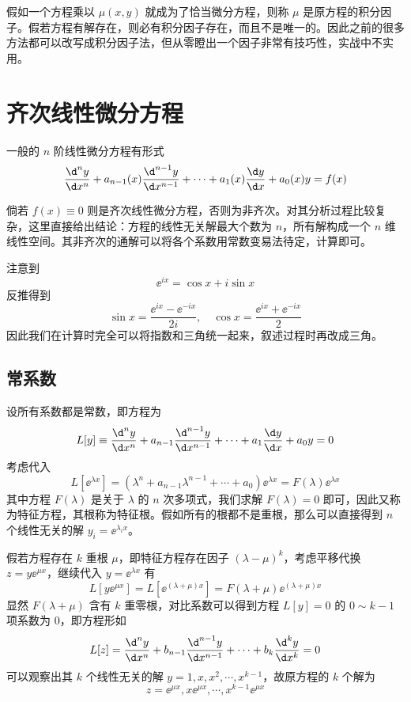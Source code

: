 假如一个方程乘以 $\mu(x, y)$ 就成为了恰当微分方程，则称 $\mu$ 是原方程的积分因子。假若方程有解存在，则必有积分因子存在，而且不是唯一的。因此之前的很多方法都可以改写成积分因子法，但从零瞪出一个因子非常有技巧性，实战中不实用。

\section{齐次线性微分方程}

一般的 $n$ 阶线性微分方程有形式
\[ \frac{\d^n y}{\d x^n} + a_{n-1}(x) \frac{\d^{n-1} y}{\d x^{n-1}} + \cdots + a_1(x) \frac{\d y}{\d x} + a_0(x) y = f(x) \]

倘若 $f(x) \equiv 0$ 则是齐次线性微分方程，否则为非齐次。对其分析过程比较复杂，这里直接给出结论：方程的线性无关解最大个数为 $n$，所有解构成一个 $n$ 维线性空间。其非齐次的通解可以将各个系数用常数变易法待定，计算即可。

注意到
\[ \ee^{i x} = \cos x + i \sin x \]
反推得到
\[ \sin x = \frac{\ee^{i x} - \ee^{-i x}}{2i}, \quad \cos x = \frac{\ee^{ix} + \ee^{-ix}}{2} \]
因此我们在计算时完全可以将指数和三角统一起来，叙述过程时再改成三角。

\subsection{常系数}

设所有系数都是常数，即方程为
\[ L[y] \equiv \frac{\d^n y}{\d x^n} + a_{n-1} \frac{\d^{n-1} y}{\d x^{n-1}} + \cdots + a_1 \frac{\d y}{\d x} + a_0 y = 0 \]
考虑代入
\[ L[\ee^{\lambda x}] = (\lambda^n + a_{n-1} \lambda^{n-1} + \cdots + a_0) \ee^{\lambda x} = F(\lambda) \ee^{\lambda x} \]
其中方程 $F(\lambda)$ 是关于 $\lambda$ 的 $n$ 次多项式，我们求解 $F(\lambda) = 0$ 即可，因此又称为特征方程，其根称为特征根。假如所有的根都不是重根，那么可以直接得到 $n$ 个线性无关的解 $y_i = \ee^{\lambda_i x}$。

假若方程存在 $k$ 重根 $\mu$，即特征方程存在因子 $(\lambda - \mu)^k$，考虑平移代换 $z = y \ee^{\mu x}$，继续代入 $y = \ee^{\lambda x}$ 有
\[ L[y \ee^{\mu x}] = L[\ee^{(\lambda + \mu) x}] = F(\lambda + \mu) \ee^{(\lambda + \mu) x} \]
显然 $F(\lambda + \mu)$ 含有 $k$ 重零根，对比系数可以得到方程 $L[y] = 0$ 的 $0 \sim k-1$ 项系数为 $0$，即方程形如
\[ L[z] = \frac{\d^n y}{\d x^n} + b_{n-1} \frac{\d^{n-1} y}{\d x^{n-1}} + \cdots + b_{k} \frac{\d^k y}{\d x^k} = 0 \]
可以观察出其 $k$ 个线性无关的解 $y = 1, x, x^2, \cdots, x^{k-1}$，故原方程的 $k$ 个解为
\[ z = \ee^{\mu x}, x \ee^{\mu x}, \cdots, x^{k-1} \ee^{\mu x} \]

